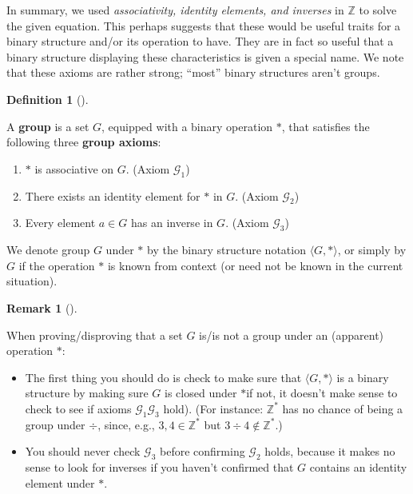 \documentclass[10pt,]{book}
\newcommand{\terminology}[1]{\textbf{#1}}
\theoremstyle{plain}
\theoremstyle{definition}
\newtheorem{definition}[theorem]{Definition}
\theoremstyle{definition}
\newtheorem{remark}[theorem]{Remark}
\theoremstyle{definition}
\theoremstyle{definition}
\numberwithin{equation}{section}
\def\Z{\mathbb{Z}}
\def\G{\mathcal{G}}
\begin{document}
    In summary, we used \emph{associativity, identity elements, and
    inverses} in \(\Z\) to solve the given equation. This perhaps
    suggests that these would be useful traits for a binary
    structure and/or its operation to have. They are in fact so
    useful that a binary structure displaying these characteristics
    is given a special name. We note that these axioms are rather
    strong; ``most'' binary structures aren't groups.
\begin{definition}[{}]\label{definition-19}

        A \terminology{group} is a set \(G\), equipped with a binary
        operation \(*\), that satisfies the following three \terminology{group
        axioms}:
        \leavevmode%
\begin{enumerate}[label=\Roman*]
\item\hypertarget{li-74}{}
              \(*\) is associative on \(G\). (Axiom \(\G_1\))
\item\hypertarget{li-75}{}
              There exists an identity element for \(*\) in \(G\). (Axiom \(\G_2\))
\item\hypertarget{li-76}{}
              Every element \(a\in G\) has an inverse in \(G\). (Axiom \(\G_3\))

\end{enumerate}

\par

        We
        denote group \(G\) under \(*\) by the binary structure notation
        \(\langle G,*\rangle\), or simply by \(G\) if the operation \(*\) is known
        from context (or need not be known in the current
        situation).
\end{definition}
\begin{remark}[]\label{remark-7}

  When proving/disproving that a set \(G\) is/is
    not a group under an (apparent) operation \(*\):
    \leavevmode%
\begin{itemize}[label=\textbullet]
\item{}
          The first thing you should do is check to make sure that  \(\langle G,*\rangle\)
          is a binary structure by making sure \(G\) is closed under \(*\)\textemdash{}if not, it doesn't make sense to
          check to see if axioms \(\G_1\)\textendash{}\(\G_3\) hold). (For instance: \(\Z^*\) has no chance of being a group under
          \(\div\), since, e.g., \(3,4\in \Z^*\) but \(3 \div 4 \not\in\Z^*\).)
\item{}
          You should never check \(\G_3\) before confirming
          \(\G_2\) holds, because it makes no sense to look for
          inverses if you haven't confirmed that \(G\) contains an
          identity element under \(*\).
\end{itemize}
%
\end{remark}
\typeout{************************************************}
\typeout{************************************************}
\end{document}
